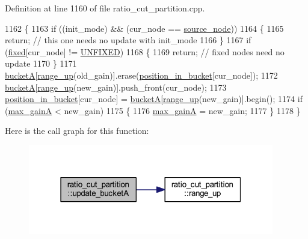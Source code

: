 Definition at line 1160 of file ratio\+\_\+cut\+\_\+partition.\+cpp.


\begin{DoxyCode}
1162 \{
1163     \textcolor{keywordflow}{if} ((init\_mode) && (cur\_node == \mbox{\hyperlink{classratio__cut__partition_abb18c3acafc590e258453d7a8d86bb49}{source\_node}}))
1164     \{
1165     \textcolor{keywordflow}{return}; \textcolor{comment}{// this one needs no update with init\_mode}
1166     \}
1167     \textcolor{keywordflow}{if} (\mbox{\hyperlink{classratio__cut__partition_ad77023b9f60e88274bf54f2019404768}{fixed}}[cur\_node] != \mbox{\hyperlink{classratio__cut__partition_a153cc7e51ac5d72a00671b6bdbcc6fa5}{UNFIXED}})
1168     \{
1169     \textcolor{keywordflow}{return}; \textcolor{comment}{// fixed nodes need no update}
1170     \}
1171     \mbox{\hyperlink{classratio__cut__partition_ac9c2f4f99e1042d69f44c1a1f79d4a2f}{bucketA}}[\mbox{\hyperlink{classratio__cut__partition_a5cda26b908793b59881798d88b07344c}{range\_up}}(old\_gain)].erase(\mbox{\hyperlink{classratio__cut__partition_a871af9a7ed4cb1c101e6620ff99cb8d7}{position\_in\_bucket}}[cur\_node]);
1172     \mbox{\hyperlink{classratio__cut__partition_ac9c2f4f99e1042d69f44c1a1f79d4a2f}{bucketA}}[\mbox{\hyperlink{classratio__cut__partition_a5cda26b908793b59881798d88b07344c}{range\_up}}(new\_gain)].push\_front(cur\_node);
1173     \mbox{\hyperlink{classratio__cut__partition_a871af9a7ed4cb1c101e6620ff99cb8d7}{position\_in\_bucket}}[cur\_node] = \mbox{\hyperlink{classratio__cut__partition_ac9c2f4f99e1042d69f44c1a1f79d4a2f}{bucketA}}[\mbox{\hyperlink{classratio__cut__partition_a5cda26b908793b59881798d88b07344c}{range\_up}}(new\_gain)].begin();
1174     \textcolor{keywordflow}{if} (\mbox{\hyperlink{classratio__cut__partition_ae69ef6876be68d5752d247564a524c6a}{max\_gainA}} < new\_gain)
1175     \{
1176     \mbox{\hyperlink{classratio__cut__partition_ae69ef6876be68d5752d247564a524c6a}{max\_gainA}} = new\_gain;
1177     \}
1178 \}
\end{DoxyCode}
Here is the call graph for this function\+:\nopagebreak
\begin{figure}[H]
\begin{center}
\leavevmode
\includegraphics[width=304pt]{classratio__cut__partition_acbd0608a7e5560a52c447711cb59a644_cgraph}
\end{center}
\end{figure}
